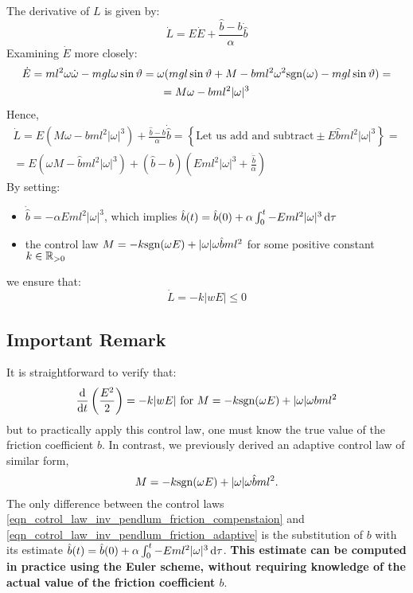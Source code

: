 \documentclass[12pt]{article}
\begin{document}
The derivative of $L$ is given by:
$$
    \dot{L} = E \dot{E} + \frac{\hat{b} - b}{\alpha} \dot{\hat{b}}
$$
Examining $\dot{E}$ more closely:
\begin{multline*}
    \dot{E} = ml^2 \omega \dot{\omega} - mgl \omega \sin\vartheta  = \omega (mgl \sin \vartheta + M - b ml^2 \omega ^ 2 {\text{sgn}}(\omega)  - mgl \sin \vartheta) = 
    \\
    = M\omega - b ml^2 |\omega| ^ 3
\end{multline*}
Hence,
\begin{multline*}
    \dot{L} = E (M\omega - b ml^2 |\omega| ^ 3) +  \frac{\hat{b} - b}{\alpha} \dot{\hat{b}} = 
    \left\{\text{Let us add and subtract} \pm  E\hat{b}ml^2 |\omega| ^ 3\right\} = \\ 
    = E (\omega M - \hat{b} ml^2 |\omega| ^ 3) + \left(\hat{b} - b\right)\left(E ml^2 |\omega| ^ 3 + \frac{\dot{\hat{b}}}{\alpha} \right)
\end{multline*}
By setting:
\begin{itemize}
    \item $\dot{\hat{b}} = - \alpha E m l ^ 2 |\omega| ^ 3$, which implies  $\hat{b}(t) = \hat{b}(0) +  \alpha \int_0^t - E m l ^ 2 |\omega| ^ 3 \mathop{}\!\mathrm{d} \tau $
    \item the control law $M = - k {\text{sgn}}(\omega E) + |\omega|\omega \hat{b} m l ^ 2$  for some positive constant $k \in {\mathbb{R}}_{> 0}$
\end{itemize}
we ensure that:
$$
    \dot{L} = - k |w E| \leq 0
$$
\subsection*{Important Remark}
It is straightforward to verify that:
\begin{equation}
    \label{eqn_cotrol_law_inv_pendlum_friction_compenstaion}
    \frac{\mathop{}\!\mathrm{d} }{\mathop{}\!\mathrm{d} t} \left(\frac{E ^ 2}{2}\right) =  - k |w E| \text{ for }  M = - k {\text{sgn}}(\omega E) + |\omega|\omega b m l ^ 2
\end{equation}
but to practically apply this control law, one must know the true value of the friction coefficient $b$. In contrast, we previously derived an adaptive control law of similar form,
\begin{equation}
    \label{eqn_cotrol_law_inv_pendlum_friction_adaptive}
    M = - k {\text{sgn}}(\omega E) + |\omega|\omega \hat{b} m l ^ 2.
\end{equation}
The only difference between the control laws \eqref{eqn_cotrol_law_inv_pendlum_friction_compenstaion} and \eqref{eqn_cotrol_law_inv_pendlum_friction_adaptive} is the substitution of $b$ with its estimate $\hat{b}(t) =\hat{b}(0) +  \alpha \int_0^t - E m l ^ 2 |\omega| ^ 3 \mathop{}\!\mathrm{d} \tau $. \textbf{This estimate can be computed in practice using the Euler scheme, without requiring knowledge of the actual value of the friction coefficient $b$}.
\end{document}

